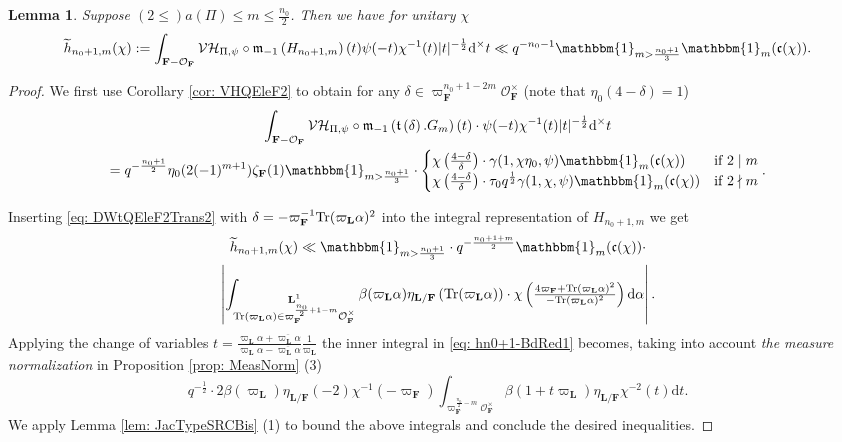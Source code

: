 \documentclass[A4]{amsart}
\def\leq{\leqslant}
\newtheorem{lemma}      [theorem]{Lemma}
\numberwithin{equation}{section} \everymath{\displaystyle}
\newcommand{\Tr}{{\rm Tr}}
\newcommand{\id}{\mathbbm{1}}
\newcommand{\ud}{\mathrm{d}}
\newcommand{\F}{\mathbf{F}}
\newcommand{\bL}{\mathbf{L}}
\newcommand{\vO}{\mathcal{O}}
\newcommand{\norm}[1][\cdot]{\lvert #1 \rvert}
\newcommand{\extnorm}[1]{\left\lvert #1 \right\rvert}
\newcommand{\Mult}{\mathfrak{m}}
\newcommand{\VorH}{\mathcal{VH}}
\newcommand{\Trans}{\mathfrak{t}}
\newcommand{\cond}{\mathfrak{c}}
\begin{document}
\begin{lemma} \label{lem: e2DWt-FineBd2}
	Suppose $(2 \leq) a(\Pi) \leq m \leq \tfrac{n_0}{2}$. Then we have for unitary $\chi$
	$$ \widetilde{h}_{n_0+1,m}(\chi) := \int_{\F-\vO_{\F}} \VorH_{\Pi,\psi} \circ \Mult_{-1} \left( H_{n_0+1,m} \right)(t) \psi(-t)\chi^{-1}(t)\norm[t]^{-\frac{1}{2}} \ud^{\times} t \ll q^{-n_0-1} \id_{m > \frac{n_0+1}{3}} \id_m(\cond(\chi)). $$
\end{lemma}
\begin{proof}
	We first use Corollary \ref{cor: VHQEleF2} to obtain for any $\delta \in \varpi_{\F}^{n_0+1-2m} \vO_{\F}^{\times}$ (note that $\eta_0(4-\delta)=1$)
\begin{multline} \label{eq: DWtQEleF2Trans2}
	\int_{\F-\vO_{\F}} \VorH_{\Pi,\psi} \circ \Mult_{-1} \left( \Trans \left( \delta \right).G_m \right)(t) \cdot \psi(-t) \chi^{-1}(t) \norm[t]^{-\frac{1}{2}} \ud^{\times} t \\
	= q^{-\frac{n_0+1}{2}} \eta_0(2(-1)^{m+1}) \zeta_{\F}(1) \id_{m > \frac{n_0+1}{3}} \cdot \begin{cases}
		\chi \left( \tfrac{4-\delta}{\delta} \right) \cdot \gamma(1,\chi\eta_0,\psi) \id_{m}(\cond(\chi)) & \text{if } 2 \mid m \\
		\chi \left( \tfrac{4-\delta}{\delta} \right) \cdot \tau_0 q^{\frac{1}{2}} \gamma(1,\chi,\psi) \id_{m}(\cond(\chi)) & \text{if } 2 \nmid m
	\end{cases}.
\end{multline}
	
\noindent Inserting \eqref{eq: DWtQEleF2Trans2} with $\delta = -\varpi_{\F}^{-1} \Tr(\varpi_{\bL} \alpha)^2$ into the integral representation of $H_{n_0+1,m}$ we get
\begin{multline} \label{eq: hn0+1-BdRed1}
	\widetilde{h}_{n_0+1,m}(\chi) \ll \id_{m > \frac{n_0+1}{3}} \cdot q^{-\frac{n_0+1+m}{2}} \id_{m}(\cond(\chi)) \cdot \\
	\extnorm{ \int_{\substack{\bL^1 \\ \Tr(\varpi_{\bL} \alpha) \in \varpi_{\F}^{\frac{n_0}{2}+1-m} \vO_{\F}^{\times}}} \beta(\varpi_{\bL} \alpha) \eta_{\bL/\F} \left( \Tr(\varpi_{\bL}\alpha) \right) \cdot \chi \left( \tfrac{4 \varpi_{\F} + \Tr(\varpi_{\bL} \alpha)^2}{- \Tr(\varpi_{\bL} \alpha)^2} \right) \ud \alpha }.
\end{multline}
	Applying the change of variables $t = \tfrac{\varpi_{\bL}\alpha + \overline{\varpi_{\bL}\alpha}}{\varpi_{\bL}\alpha - \overline{\varpi_{\bL}\alpha}} \tfrac{1}{\varpi_{\bL}}$ the inner integral in \eqref{eq: hn0+1-BdRed1} becomes, taking into account \emph{the measure normalization} in Proposition \ref{prop: MeasNorm} (3)
	$$ q^{-\frac{1}{2}} \cdot 2\beta(\varpi_{\bL})\eta_{\bL/\F}(-2)\chi^{-1}(-\varpi_{\F}) \int_{\varpi_{\F}^{\frac{n_0}{2}-m} \vO_{\F}^{\times}} \beta(1+t \varpi_{\bL}) \eta_{\bL/\F}\chi^{-2}(t) \ud t. $$
	We apply Lemma \ref{lem: JacTypeSRCBis} (1) to bound the above integrals and conclude the desired inequalities.
\end{proof}
\end{document}
